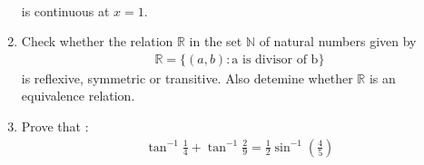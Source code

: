 \documentclass[12pt,-letter paper]{article}
\begin{document}
\begin{enumerate}
\\is continuous at $x=1$.
\item Check whether the relation $\mathbb{R}$ in the set $\mathbb{N}$ of natural numbers given by
\begin{align}
\mathbb{R} = \{(a, b) : \text{a is divisor of b}\}
\end{align}
is reflexive, symmetric or transitive. Also detemine whether $\mathbb{R}$ is an equivalence relation.
\item Prove that :
\begin{align}   \tan^{-1}\frac{1}{4}+\tan^{-1}\frac{2}{9}= \frac{1    }{2}\sin^{-1}\left(\frac{4}{5}\right)
\end{align}                          
\end{enumerate}
\end{document}
